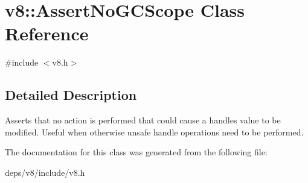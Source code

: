 \hypertarget{classv8_1_1_assert_no_g_c_scope}{}\section{v8\+:\+:Assert\+No\+G\+C\+Scope Class Reference}
\label{classv8_1_1_assert_no_g_c_scope}


{\ttfamily \#include $<$v8.\+h$>$}



\subsection{Detailed Description}
Asserts that no action is performed that could cause a handle\textquotesingle{}s value to be modified. Useful when otherwise unsafe handle operations need to be performed. 

The documentation for this class was generated from the following file\+:\begin{DoxyCompactItemize}
\item 
deps/v8/include/v8.\+h\end{DoxyCompactItemize}
